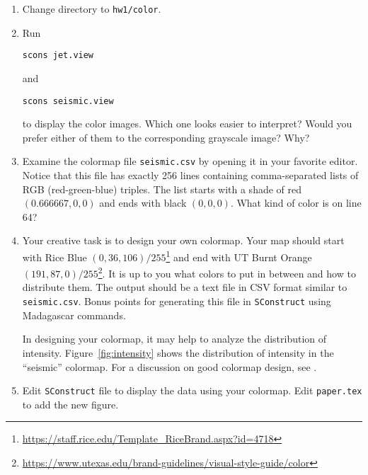\begin{enumerate}          
\item Change directory to \texttt{hw1/color}.
\item Run
\begin{verbatim}
scons jet.view
\end{verbatim}
and
\begin{verbatim}
scons seismic.view
\end{verbatim}
to display the color images. Which one looks easier to interpret? Would you prefer either of them to the corresponding grayscale image? Why?

\answer{

}


\item Examine the colormap file \texttt{seismic.csv} by opening it in your favorite editor. Notice that this file has exactly 256 lines containing comma-separated lists of RGB (red-green-blue) triples. The list starts with a shade of red $(0.666667,0,0)$ and ends with black $(0,0,0)$. What kind of color is on line 64?

\answer{

}

\item Your creative task is to design your own colormap. Your map should start with Rice Blue $(0,36,106)/255$\footnote{\url{https://staff.rice.edu/Template_RiceBrand.aspx?id=4718}} and end with UT Burnt Orange $(191,87,0)/255$\footnote{\url{https://www.utexas.edu/brand-guidelines/visual-style-guide/color}}. It is up to you what colors to put in between and how to distribute them. The output should be a text file in CSV format similar to \texttt{seismic.csv}. Bonus points for generating this file in \texttt{SConstruct} using Madagascar commands.

In designing your colormap, it may help to analyze the distribution of
intensity. Figure~\ref{fig:intensity} shows the distribution of
intensity in the ``seismic'' colormap. For a discussion on
good colormap design, see \cite[]{matteo}.


\item Edit \texttt{SConstruct} file to display the data using your colormap. Edit \texttt{paper.tex} to add the new figure.

\end{enumerate}

